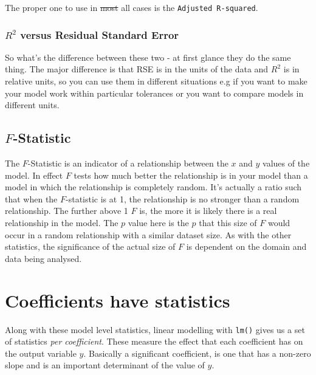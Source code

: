 \documentclass[
]{book}
\begin{document}
The proper one to use in \sout{most} all cases is the \texttt{Adjusted\ R-squared}.

\hypertarget{r2-versus-residual-standard-error}{%
\subsubsection{\texorpdfstring{\(R^2\) versus Residual Standard Error}{R\^{}2 versus Residual Standard Error}}\label{r2-versus-residual-standard-error}}

So what's the difference between these two - at first glance they do the same thing. The major difference is that RSE is in the units of the data and \(R^2\) is in relative units, so you can use them in different situations e.g if you want to make your model work within particular tolerances or you want to compare models in different units.

\hypertarget{f-statistic}{%
\subsection{\texorpdfstring{\(F\)-Statistic}{F-Statistic}}\label{f-statistic}}

The \(F\)-Statistic is an indicator of a relationship between the \(x\) and \(y\) values of the model. In effect \(F\) tests how much better the relationship is in your model than a model in which the relationship is completely random. It's actually a ratio such that when the \(F\)-statistic is at 1, the relationship is no stronger than a random relationship. The further above 1 \(F\) is, the more it is likely there is a real relationship in the model. The \(p\) value here is the \(p\) that this size of \(F\) would occur in a random relationship with a similar dataset size. As with the other statistics, the significance of the actual size of \(F\) is dependent on the domain and data being analysed.

\hypertarget{coefficients-have-statistics}{%
\section{Coefficients have statistics}\label{coefficients-have-statistics}}

Along with these model level statistics, linear modelling with \texttt{lm()} gives us a set of statistics \emph{per coefficient}. These measure the effect that each coefficient has on the output variable \(y\). Basically a significant coefficient, is one that has a non-zero slope and is an important determinant of the value of \(y\).
\end{document}
